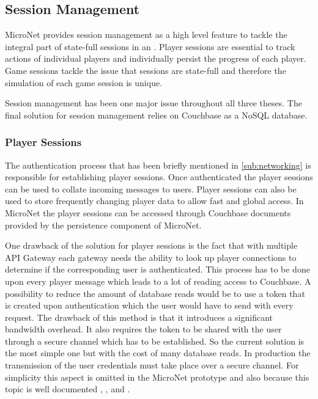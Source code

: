 \subsection{Session Management}
\label{sub:session_management}

MicroNet provides session management as a high level feature to tackle the
integral part of state-full sessions in an \og{}. Player sessions are
essential to track actions of individual players and individually persist the
progress of each player. Game sessions tackle the issue that \og{} sessions are
state-full and therefore the simulation of each game session is unique.

Session management has been one major issue throughout all three theses. The
final solution for session management relies on Couchbase as a NoSQL database.

\subsubsection{Player Sessions}

The authentication process that has been briefly mentioned in
\autoref{sub:networking} is responsible for establishing player sessions. Once
authenticated the player sessions can be used to collate incoming messages to
users. Player sessions can also be used to store frequently changing player data
to allow fast and global access. In MicroNet the player sessions can be accessed
through Couchbase documents provided by the persistence component of MicroNet.

One drawback of the solution for player sessions is the fact that with multiple
API Gateway each gateway needs the ability to look up player connections to
determine if the corresponding user is authenticated. This process has to be
done upon every player message which leads to a lot of reading access to
Couchbase. A possibility to reduce the amount of database reads would be to use
a token that is created upon authentication which the user would have to send
with every request. The drawback of this method is that it introduces a
significant bandwidth overhead. It also requires the token to be shared with the
user through a secure channel which has to be established. So the current
solution is the most simple one but with the cost of many database reads. In
production the transmission of the user credentials must take place over a
secure channel. For simplicity this aspect is omitted in the MicroNet prototype
and also because this topic is well documented \cite{sun2015security},
\cite{shieh2015methods}, and \cite{thanh2016embedding}.

